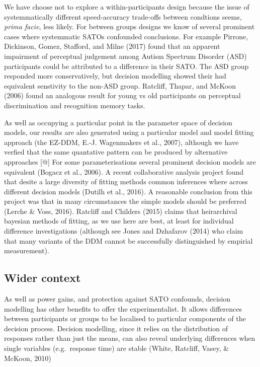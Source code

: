 \documentclass[floatsintext,doc]{apa6}
\theoremstyle{definition}
\theoremstyle{definition}
\theoremstyle{definition}
\theoremstyle{remark}
\begin{document}
We have choose not to explore a within-participants design because the
issue of systemmatically different speed-accuracy trade-offs between
condtions seems, \emph{prima facie}, less likely. For between groups
designs we know of several prominent cases where systemmatic SATOs
confounded conclusions. For example Pirrone, Dickinson, Gomez, Stafford,
and Milne (2017) found that an apparent impairment of perceptual
judgement among Autism Spectrum Disorder (ASD) participants could be
attributed to a difference in their SATO. The ASD group responded more
conservatively, but decision modelling showed their had equivalent
senstivity to the non-ASD group. Ratcliff, Thapar, and McKoon (2006)
found an analogous result for young vs old participants on perceptual
discrimination and recognition memory tasks.

As well as occupying a particular point in the parameter space of
decision models, our results are also generated using a particular model
and model fitting approach (the EZ-DDM, E.-J. Wagenmakers et al., 2007),
although we have verfied that the same quantative pattern can be
produced by alternative approaches {[}@{]} For some parameterisations
several prominent decision models are equivalent (Bogacz et al., 2006).
A recent collaborative analysis project found that desite a large
diversity of fitting methods common inferences where across different
decision models (Dutilh et al., 2016). A reasonable conclusion from this
project was that in many circumstances the simple models should be
preferred (Lerche \& Voss, 2016). Ratcliff and Childers (2015) claims
that heirarchival bayesian methods of fitting, as we use here are best,
at least for individual difference investigations (although see Jones
and Dzhafarov (2014) who claim that many variants of the DDM cannot be
successfully distinguished by empirial measurement).

\subsection{Wider context}\label{wider-context}

As well as power gains, and protection against SATO confounds, decision
modelling has other benefits to offer the experimentalist. It allows
differences between participants or groups to be localised to particular
components of the decision process. Decision modelling, since it relies
on the distribution of responses rather than just the means, can also
reveal underlying differences when single variables (e.g.~response time)
are stable (White, Ratcliff, Vasey, \& McKoon, 2010)
\end{document}
